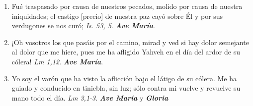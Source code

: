 \documentclass[../../devocionario.tex]{subfiles}
\begin{document}
\begin{enumerate}
        \item Fué traspasado por causa de nuestros pecados, molido por causa de nuestra iniquidades; 
            el castigo [precio] de nuestra paz cayó sobre Él y por sus verdugones se nos curó; \emph{Is. 53, 5}. \textbf{\emph{Ave María}}.

        \item ¡Oh vosotros los que pasáis por el camino, mirad y ved si hay dolor semejante al dolor que me hiere, 
            pues me ha afligido Yahveh en el día del ardor de su cólera! \emph{Lm 1,12}. \textbf{\emph{Ave María}}.

        \item Yo soy el varón que ha visto la aflicción bajo el látigo de su cólera. Me ha guiado y conducido en tiniebla, 
            sin luz; sólo contra mi vuelve y revuelve su mano todo el día. \emph{Lm 3,1-3}. \textbf{\emph{Ave María}} y \textbf{\emph{Gloria}}

    \end{enumerate}
\end{document}
